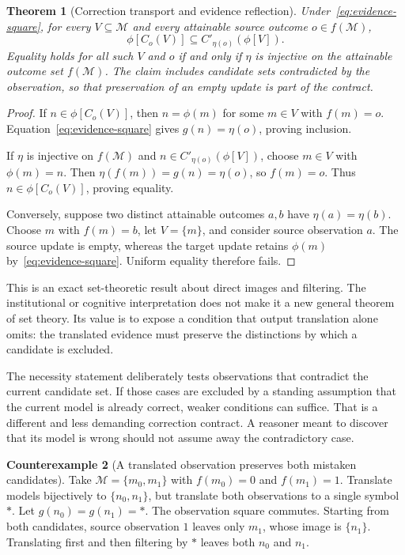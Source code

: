 \documentclass[11pt,letterpaper]{article}
\theoremstyle{plain}
\newtheorem{theorem}{Theorem}[section]
\theoremstyle{definition}
\newtheorem{counterexample}[theorem]{Counterexample}
\newcommand{\M}{\mathcal M}\newcommand{\E}{\mathbb E}
\begin{document}
\begin{theorem}[Correction transport and evidence reflection]\label{thm:correction}
Under~\eqref{eq:evidence-square}, for every $V\subseteq\M$ and every attainable source outcome $o\in f(\M)$,
\begin{equation}\label{eq:correction-inclusion}
\phi[C_o(V)]\subseteq C'_{\eta(o)}(\phi[V]).
\end{equation}
Equality holds for all such $V$ and $o$ if and only if $\eta$ is injective on the attainable outcome set $f(\M)$. The claim includes candidate sets contradicted by the observation, so that preservation of an empty update is part of the contract.
\end{theorem}
\begin{proof}
If $n\in\phi[C_o(V)]$, then $n=\phi(m)$ for some $m\in V$ with $f(m)=o$. Equation~\eqref{eq:evidence-square} gives $g(n)=\eta(o)$, proving inclusion.

If $\eta$ is injective on $f(\M)$ and $n\in C'_{\eta(o)}(\phi[V])$, choose $m\in V$ with $\phi(m)=n$. Then $\eta(f(m))=g(n)=\eta(o)$, so $f(m)=o$. Thus $n\in\phi[C_o(V)]$, proving equality.

Conversely, suppose two distinct attainable outcomes $a,b$ have $\eta(a)=\eta(b)$. Choose $m$ with $f(m)=b$, let $V=\{m\}$, and consider source observation $a$. The source update is empty, whereas the target update retains $\phi(m)$ by~\eqref{eq:evidence-square}. Uniform equality therefore fails.
\end{proof}
This is an exact set-theoretic result about direct images and filtering. The institutional or cognitive interpretation does not make it a new general theorem of set theory. Its value is to expose a condition that output translation alone omits: the translated evidence must preserve the distinctions by which a candidate is excluded.

The necessity statement deliberately tests observations that contradict the current candidate set. If those cases are excluded by a standing assumption that the current model is already correct, weaker conditions can suffice. That is a different and less demanding correction contract. A reasoner meant to discover that its model is wrong should not assume away the contradictory case.

\begin{counterexample}[A translated observation preserves both mistaken candidates]\label{ex:correction}
Take $\M=\{m_0,m_1\}$ with $f(m_0)=0$ and $f(m_1)=1$. Translate models bijectively to $\{n_0,n_1\}$, but translate both observations to a single symbol $*$. Let $g(n_0)=g(n_1)=*$. The observation square commutes. Starting from both candidates, source observation $1$ leaves only $m_1$, whose image is $\{n_1\}$. Translating first and then filtering by $*$ leaves both $n_0$ and $n_1$.
\end{counterexample}
\end{document}
